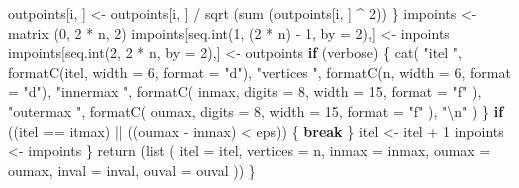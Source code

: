 \documentclass[
  12pt,
  letterpaper,
  DIV=11,
  numbers=noendperiod]{scrreprt}
\newenvironment{Shaded}{\begin{snugshade}}{\end{snugshade}}
\newcommand{\AttributeTok}[1]{\textcolor[rgb]{0.40,0.45,0.13}{#1}}
\newcommand{\ControlFlowTok}[1]{\textcolor[rgb]{0.00,0.23,0.31}{\textbf{#1}}}
\newcommand{\DecValTok}[1]{\textcolor[rgb]{0.68,0.00,0.00}{#1}}
\newcommand{\FunctionTok}[1]{\textcolor[rgb]{0.28,0.35,0.67}{#1}}
\newcommand{\NormalTok}[1]{\textcolor[rgb]{0.00,0.23,0.31}{#1}}
\newcommand{\OtherTok}[1]{\textcolor[rgb]{0.00,0.23,0.31}{#1}}
\newcommand{\SpecialCharTok}[1]{\textcolor[rgb]{0.37,0.37,0.37}{#1}}
\newcommand{\StringTok}[1]{\textcolor[rgb]{0.13,0.47,0.30}{#1}}
\theoremstyle{remark}
\begin{document}
\begin{Shaded}
\begin{Highlighting}[]
\NormalTok{        outpoints[i, ] }\OtherTok{\textless{}{-}}\NormalTok{ outpoints[i, ] }\SpecialCharTok{/} \FunctionTok{sqrt}\NormalTok{ (}\FunctionTok{sum}\NormalTok{ (outpoints[i, ] }\SpecialCharTok{\^{}} \DecValTok{2}\NormalTok{))}
\NormalTok{      \}}
\NormalTok{      impoints }\OtherTok{\textless{}{-}} \FunctionTok{matrix}\NormalTok{ (}\DecValTok{0}\NormalTok{, }\DecValTok{2} \SpecialCharTok{*}\NormalTok{ n, }\DecValTok{2}\NormalTok{)}
\NormalTok{      impoints[}\FunctionTok{seq.int}\NormalTok{(}\DecValTok{1}\NormalTok{, (}\DecValTok{2} \SpecialCharTok{*}\NormalTok{ n) }\SpecialCharTok{{-}} \DecValTok{1}\NormalTok{, }\AttributeTok{by =} \DecValTok{2}\NormalTok{),] }\OtherTok{\textless{}{-}}\NormalTok{ inpoints}
\NormalTok{      impoints[}\FunctionTok{seq.int}\NormalTok{(}\DecValTok{2}\NormalTok{, }\DecValTok{2} \SpecialCharTok{*}\NormalTok{ n, }\AttributeTok{by =} \DecValTok{2}\NormalTok{),] }\OtherTok{\textless{}{-}}\NormalTok{ outpoints}
      \ControlFlowTok{if}\NormalTok{ (verbose) \{}
        \FunctionTok{cat}\NormalTok{(}
          \StringTok{"itel "}\NormalTok{,}
          \FunctionTok{formatC}\NormalTok{(itel, }\AttributeTok{width =} \DecValTok{6}\NormalTok{, }\AttributeTok{format =} \StringTok{"d"}\NormalTok{),}
          \StringTok{"vertices "}\NormalTok{,}
          \FunctionTok{formatC}\NormalTok{(n, }\AttributeTok{width =} \DecValTok{6}\NormalTok{, }\AttributeTok{format =} \StringTok{"d"}\NormalTok{),}
          \StringTok{"innermax "}\NormalTok{,}
          \FunctionTok{formatC}\NormalTok{(}
\NormalTok{            inmax,}
            \AttributeTok{digits =} \DecValTok{8}\NormalTok{,}
            \AttributeTok{width =} \DecValTok{15}\NormalTok{,}
            \AttributeTok{format =} \StringTok{"f"}
\NormalTok{          ),}
          \StringTok{"outermax "}\NormalTok{,}
          \FunctionTok{formatC}\NormalTok{(}
\NormalTok{            oumax,}
            \AttributeTok{digits =} \DecValTok{8}\NormalTok{,}
            \AttributeTok{width =} \DecValTok{15}\NormalTok{,}
            \AttributeTok{format =} \StringTok{"f"}
\NormalTok{          ),}
          \StringTok{"}\SpecialCharTok{\textbackslash{}n}\StringTok{"}
\NormalTok{        )}
\NormalTok{      \}}
      \ControlFlowTok{if}\NormalTok{ ((itel }\SpecialCharTok{==}\NormalTok{ itmax) }\SpecialCharTok{||}\NormalTok{ ((oumax }\SpecialCharTok{{-}}\NormalTok{ inmax) }\SpecialCharTok{\textless{}}\NormalTok{ eps)) \{}
        \ControlFlowTok{break}
\NormalTok{      \}}
\NormalTok{      itel }\OtherTok{\textless{}{-}}\NormalTok{ itel }\SpecialCharTok{+} \DecValTok{1}
\NormalTok{      inpoints }\OtherTok{\textless{}{-}}\NormalTok{ impoints}
\NormalTok{    \}}
    \FunctionTok{return}\NormalTok{ (}\FunctionTok{list}\NormalTok{ (}
      \AttributeTok{itel =}\NormalTok{ itel,}
      \AttributeTok{vertices =}\NormalTok{ n,}
      \AttributeTok{inmax =}\NormalTok{ inmax,}
      \AttributeTok{oumax =}\NormalTok{ oumax,}
      \AttributeTok{inval =}\NormalTok{ inval,}
      \AttributeTok{ouval =}\NormalTok{ ouval}
\NormalTok{    ))}
\NormalTok{  \}}
\end{Highlighting}
\end{Shaded}
\end{document}
